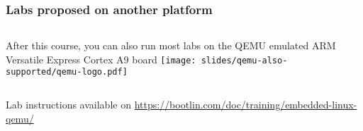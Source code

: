 \begin{frame}
\frametitle{Labs proposed on another platform}
  \begin{columns}
    After this course, you can also run most labs on the QEMU emulated
    ARM Versatile Express Cortex A9 board
    \texttt{[image: slides/qemu-also-supported/qemu-logo.pdf]}
  \end{columns}
  \vspace{1cm}
  Lab instructions available on
  \url{https://bootlin.com/doc/training/embedded-linux-qemu/}
\end{frame}
